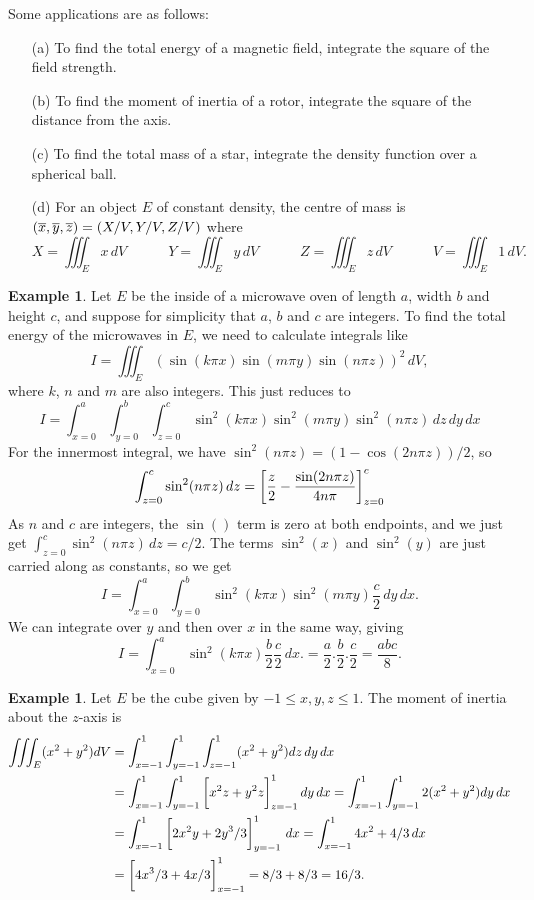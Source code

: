 \documentclass[reqno]{amsart}
\theoremstyle{definition}
\newtheorem{example}[theorem]{Example}
\begin{document}
Some applications are as follows:
\begin{itemize}
 \item[(a)] To find the total energy of a magnetic field, integrate 
  the square of the field strength.
 \item[(b)] To find the moment of inertia of a rotor, integrate the 
  square of the distance from the axis.
 \item[(c)] To find the total mass of a star, integrate the density 
  function over a spherical ball.
 \item[(d)] For an object $E$ of constant density, the centre of mass
  is $(\overline{x},\overline{y},\overline{z})=(X/V,Y/V,Z/V)$ where 
  \[ X=\iiint_Ex\,dV \hspace{3em}
     Y=\iiint_Ey\,dV \hspace{3em}
     Z=\iiint_Ez\,dV \hspace{3em}
     V=\iiint_E1\,dV.
  \]
\end{itemize}

\begin{example}
 Let $E$ be the inside of a microwave oven of length $a$, width $b$
 and height $c$, and suppose for simplicity that $a$, $b$ and $c$ are
 integers.  To find the total energy of the microwaves in $E$, we need
 to calculate integrals like 
 \[ I = \iiint_E (\sin(k\pi x)\sin(m\pi y)\sin(n\pi z))^2\,dV, \]
 where $k$, $n$ and $m$ are also integers.  This just reduces to 
 \[ I = \int_{x=0}^a \int_{y=0}^b \int_{z=0}^c 
        \sin^2(k\pi x)\sin^2(m\pi y)\sin^2(n\pi z) \,dz\,dy\,dx
 \]
 For the innermost integral, we have
 $\sin^2(n\pi z)=(1-\cos(2n\pi z))/2$, so 
 \[ \int_{z=0}^c \sin^2(n\pi z)\,dz = 
     \CH{\frac{z}{2}-\frac{\sin(2n\pi z)}{4n\pi}}_{z=0}^c
 \]
 As $n$ and $c$ are integers, the $\sin()$ term is zero at both
 endpoints, and we just get $\int_{z=0}^c\sin^2(n\pi z)\,dz=c/2$.  The
 terms $\sin^2(x)$ and $\sin^2(y)$ are just carried along as
 constants, so we get 
 \[ I = \int_{x=0}^a \int_{y=0}^b 
        \sin^2(k\pi x)\sin^2(m\pi y)\frac{c}{2} \,dy\,dx.
 \]
 We can integrate over $y$ and then over $x$ in the same way, giving 
 \[ I = \int_{x=0}^a \sin^2(k\pi x)\frac{b}{2}\frac{c}{2} \,dx.
      = \frac{a}{2}.\frac{b}{2}.\frac{c}{2} = \frac{abc}{8}.
 \]
\end{example}

\begin{example}
 Let $E$ be the cube given by $-1\leq x,y,z\leq 1$.  The moment of
 inertia about the $z$-axis is
 \begin{align*}
  \iiint_E (x^2+y^2)dV 
   &= \int_{x=-1}^1 \int_{y=-1}^1 \int_{z=-1}^1 (x^2+y^2) dz\,dy\,dx \\
   &= \int_{x=-1}^1 \int_{y=-1}^1 \CH{x^2z+y^2z}_{z=-1}^1 dy\,dx 
    = \int_{x=-1}^1 \int_{y=-1}^1 2(x^2+y^2) dy\,dx \\
   &= \int_{x=-1}^1 \CH{2x^2y+2y^3/3}_{y=-1}^1 \,dx 
    = \int_{x=-1}^1 4x^2+4/3\,dx \\
   &= \CH{4x^3/3+4x/3}_{x=-1}^1 = 8/3+8/3=16/3.
 \end{align*}
\end{example}
\end{document}
